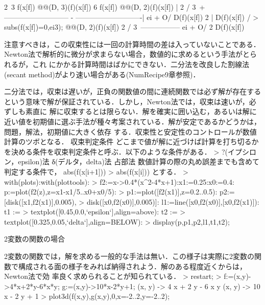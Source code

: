                                                               2\             
     3 f(x[f]) @@(D, 3)(f)(x[f])   6 f(x[f]) @@(D, 2)(f)(x[f]) |   2    /  3\
   + --------------------------- - ----------------------------| ei  + O\ei /
             D(f)(x[f])                              2         |             
                                           D(f)(x[f])          /             
> subs(f(x[f])=0,ei3);
                        @@(D, 2)(f)(x[f])   2    /  3\
                        ----------------- ei  + O\ei /
                          2 D(f)(x[f])                

注意すべきは，この収束性には一回の計算時間の差は入っていないことである．Newton法で解析的に微分が求まらない場合，数値的に求めるという手法がとられるが，これ
にかかる計算時間はばかにできない．二分法を改良した割線法(secant method)がより速い場合がある(NumRecipe9章参照)．

二分法では，収束は遅いが，正負の関数値の間に連続関数では必ず解が存在するという意味で解が保証されている．しかし，Newton法では，収束は速いが，必ずしも素直に
解に収束するとは限らない．解を確実に囲い込む，あるいは解に近い値を初期値に選ぶ手法が種々考案されている．解が安定であるかどうかは，問題，解法，初期値に大きく依存
する．収束性と安定性のコントロールが数値計算のツボとなる．
収束判定条件
どこまで値が解に近づけば計算を打ち切るかを決める条件を収束判定条件と呼ぶ．以下のような条件がある．
> ?(イプシロン，epsilon)法 δ(デルタ，delta)法
占部法
数値計算の際の丸め誤差までも含めて判定する条件で，
abs(f(x[i+1])) > abs(f(x[i]))
とする．
> with(plots):with(plottools):
> f2:=x->0.4*(x^2-4*x+1):x1:=0.25:x0:=0.4: p:=plot(f2(z),z=x1-x1/5..x0+x0/5):
> p1:=plot([f2(x1)],z=0.2..0.5): p2:=[disk([x1,f2(x1)],0.005),
> disk([x0,f2(x0)],0.005)]: l1:=line([x0,f2(x0)],[x0,f2(x1)]): t1 :=
> textplot([0.45,0.0,`epsilon`],align=above): t2 :=
> textplot([0.325,0.05,`delta`],align=BELOW):
> display(p,p1,p2,l1,t1,t2);

2変数の関数の場合

2変数の関数では，解を求める一般的な手法は無い．この様子は実際に2変数の関数で構成される面の様子をみれば納得されよう．解のある程度近くからは，Newton法で効
率良く求められることが知られている．
> restart;
> f:=(x,y)->4*x+2*y-6*x*y; g:=(x,y)->10*x-2*y+1;
(x, y) -> 4 x + 2 y - 6 x y
(x, y) -> 10 x - 2 y + 1
> plot3d({f(x,y),g(x,y),0},x=-2..2,y=-2..2);

